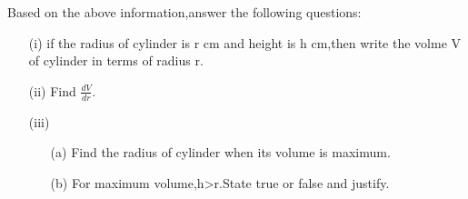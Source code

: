 \documentclass{article}
\begin{document}
\begin{enumerate}
		Based on the above information,answer the following questions:\\
		
			\begin{enumerate}
				\item[(i)] if the radius of cylinder is r cm and height is h cm,then write the volme V of cylinder in terms of radius r.
					\\
				\item[(ii)] Find $ \frac {dV}{dr} $.
					\\
				\item[(iii)] \begin{enumerate}
						\item[(a)] Find the radius of cylinder when its volume is maximum.\\
			
		\item[(b)] For maximum volume,h>r.State true or false and justify.
				
			
				\end{enumerate}
			\end{enumerate}
\end{enumerate}
\end{document}
